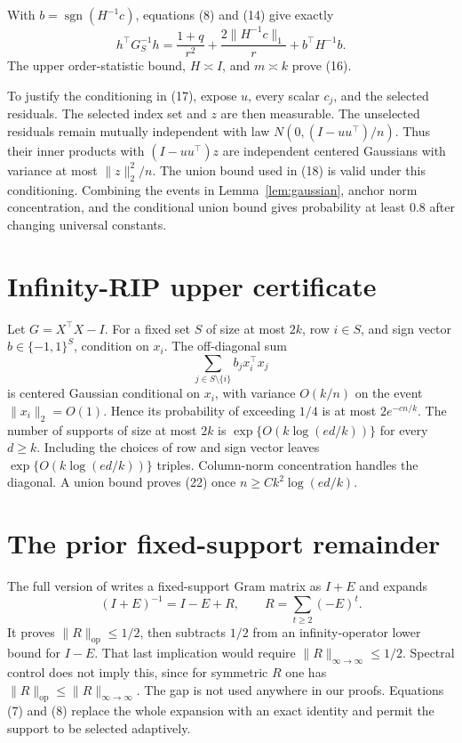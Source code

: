 \documentclass[twoside]{article}
\newcommand{\sgn}{\operatorname{sgn}}
\begin{document}
With $b=\sgn(H^{-1}c)$, equations (8) and (14) give exactly \[ h^\top G_S^{-1}h =\frac{1+q}{r^2}+\frac{2\|H^{-1}c\|_1}{r} +b^\top H^{-1}b. \] The upper order-statistic bound, $H\asymp I$, and $m\asymp k$ prove (16).

To justify the conditioning in (17), expose $u$, every scalar $c_j$, and the selected residuals. The selected index set and $z$ are then measurable. The unselected residuals remain mutually independent with law $N(0,(I-uu^\top)/n)$. Thus their inner products with $(I-uu^\top)z$ are independent centered Gaussians with variance at most $\|z\|_2^2/n$. The union bound used in (18) is valid under this conditioning. Combining the events in Lemma~\ref{lem:gaussian}, anchor norm concentration, and the conditional union bound gives probability at least $0.8$ after changing universal constants.

\section{Infinity-RIP upper certificate}
\label{app:upper}

Let $G=X^\top X-I$. For a fixed set $S$ of size at most $2k$, row $i\in S$, and sign vector $b\in\{-1,1\}^S$, condition on $x_i$. The off-diagonal sum \[ \sum_{j\in S\setminus\{i\}}b_jx_i^\top x_j \] is centered Gaussian conditional on $x_i$, with variance $O(k/n)$ on the event $\|x_i\|_2=O(1)$. Hence its probability of exceeding $1/4$ is at most $2e^{-cn/k}$. The number of supports of size at most $2k$ is $\exp\{O(k\log(ed/k))\}$ for every $d\geq k$. Including the choices of row and sign vector leaves $\exp\{O(k\log(ed/k))\}$ triples. Column-norm concentration handles the diagonal. A union bound proves (22) once $n\geq Ck^2\log(ed/k)$.

\section{The prior fixed-support remainder}
\label{app:prior}

The full version of \citet{chen2026adaptive} writes a fixed-support Gram matrix as $I+E$ and expands \[ (I+E)^{-1}=I-E+R, \qquad R=\sum_{t\geq2}(-E)^t. \] It proves $\|R\|_{\mathrm{op}}\leq1/2$, then subtracts $1/2$ from an infinity-operator lower bound for $I-E$. That last implication would require $\|R\|_{\infty\to\infty}\leq1/2$. Spectral control does not imply this, since for symmetric $R$ one has $\|R\|_{\mathrm{op}}\leq\|R\|_{\infty\to\infty}$. The gap is not used anywhere in our proofs. Equations (7) and (8) replace the whole expansion with an exact identity and permit the support to be selected adaptively.
\end{document}
